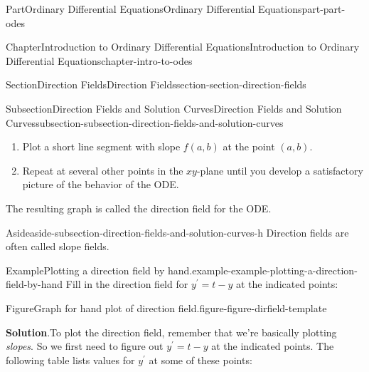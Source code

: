 \documentclass[twoside,10pt,]{book}
\newcommand{\blocktitlefont}{\relax}
\numberwithin{equation}{part}
\begin{document}
\begin{partptx}{Part}{Ordinary Differential Equations}{}{Ordinary Differential Equations}{}{}{part-part-odes}
\begin{chapterptx}{Chapter}{Introduction to Ordinary Differential Equations}{}{Introduction to Ordinary Differential Equations}{}{}{chapter-intro-to-odes}
\begin{sectionptx}{Section}{Direction Fields}{}{Direction Fields}{}{}{section-section-direction-fields}
\begin{subsectionptx}{Subsection}{Direction Fields and Solution Curves}{}{Direction Fields and Solution Curves}{}{}{subsection-subsection-direction-fields-and-solution-curves}
\begin{enumerate}
\item{}Plot a short line segment with slope \(f(a,b)\) at the point \((a,b)\).%
\item{}Repeat at several other points in the \(xy\)-plane until you develop a satisfactory picture of the behavior of the ODE.%
\end{enumerate}
The resulting graph is called the direction field for the ODE.%
\begin{aside}{Aside}{}{aside-subsection-direction-fields-and-solution-curves-h}%
Direction fields are often called slope fields.%
\end{aside}
\begin{example}{Example}{Plotting a direction field by hand.}{example-example-plotting-a-direction-field-by-hand}%
Fill in the direction field for \(y^\prime = t - y\) at the indicated points:%
\begin{figureptx}{Figure}{Graph for hand plot of direction field.}{figure-figure-dirfield-template}{}%
\begin{image}{0.25}{0.5}{0.25}{}%
%
\end{image}%
\tcblower
\end{figureptx}%
\par\smallskip%
\noindent\textbf{\blocktitlefont Solution}.\hypertarget{solution-example-plotting-a-direction-field-by-hand-c}{}\quad{}To plot the direction field, remember that we're basically plotting \emph{slopes}. So we first need to figure out \(y^\prime = t-y\) at the indicated points. The following table lists values for \(y^\prime\) at some of these points:%

\end{example}
\end{subsectionptx}
\end{sectionptx}
\end{chapterptx}
\end{partptx}
\end{document}
